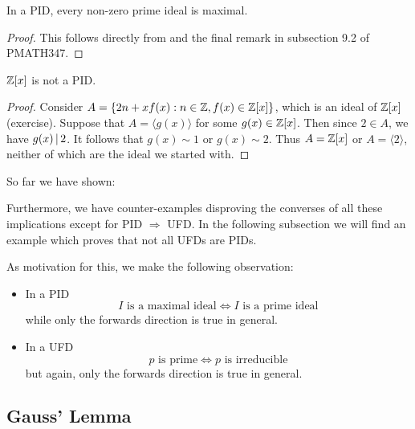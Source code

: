\documentclass[11pt]{article}
\begin{document}
\begin{corollary}
    In a PID, every non-zero prime ideal is maximal.
\end{corollary}

\begin{proof}
    This follows directly from  and the final remark in subsection 9.2 of PMATH347.
\end{proof}

\begin{example}
    $\mathbb{Z}[x]$ is not a PID.
\end{example}

\begin{proof}
    Consider $A=\{2n+xf(x):n\in\mathbb{Z},f(x)\in\mathbb{Z}[x]\}$, which is an ideal of $\mathbb{Z}[x]$ (exercise). Suppose that $A=\langle g(x)\rangle$ for some $g(x)\in\mathbb{Z}[x]$. Then since $2\in A$, we have $g(x)\,|\, 2$. It follows that $g(x)\sim 1$ or $g(x)\sim 2$. Thus $A=\mathbb{Z}[x]$ or $A=\langle 2\rangle$, neither of which are the ideal we started with.
\end{proof}

\begin{remark}
    So far we have shown:
    \begin{center}
    \end{center}
    
    Furthermore, we have counter-examples disproving the converses of all these implications except for PID $\Rightarrow$ UFD. In the following subsection we will find an example which proves that not all UFDs are PIDs.

    As motivation for this, we make the following observation:
    \begin{itemize}
        \item In a PID
        \[\text{$I$ is a maximal ideal}\iff\text{$I$ is a prime ideal}\]
        while only the forwards direction is true in general.

        \item In a UFD
        \[\text{$p$ is prime}\iff\text{$p$ is irreducible}\]
        but again, only the forwards direction is true in general.
    \end{itemize}
\end{remark}

\subsection{Gauss' Lemma}
\end{document}
